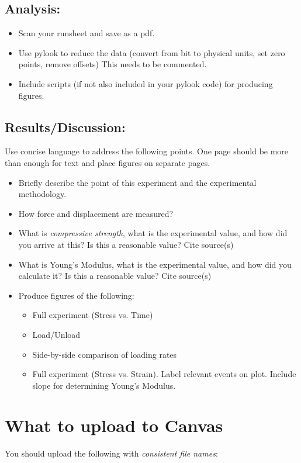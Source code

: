\documentclass[10pt]{article}
\begin{document}
\subsection*{Analysis:}
\begin{itemize}
	\item Scan your runsheet and save as a pdf.
	\item Use pylook to reduce the data (convert from bit to physical units, set zero points, remove offsets) This needs to be commented. 
	\item Include scripts (if not also included in your pylook code) for producing figures.
\end{itemize}


\subsection*{Results/Discussion:}
Use concise language to address the following points. One page should be more than enough for text and place figures on separate pages. 
\begin{itemize}
	\item Briefly describe the point of this experiment and the experimental methodology.
	\item How force and displacement are measured?
	\item What is \textit{compressive strength}, what is the experimental value, and how did you arrive at this? Is this a reasonable value? Cite source(s)
	\item What is Young's Modulus, what is the experimental value, and how did you calculate it? Is this a reasonable value? Cite source(s)
	\item Produce figures of the following: 
	\begin{itemize}
		\item Full experiment (Stress vs. Time)
		\item Load/Unload
		\item Side-by-side comparison of loading rates
		\item Full experiment (Stress vs. Strain). Label relevant events on plot. Include slope for determining Young's Modulus.
	\end{itemize}
\end{itemize}


\section*{What to upload to Canvas}
You should upload the following with \textit{consistent file names}:
\end{document}
